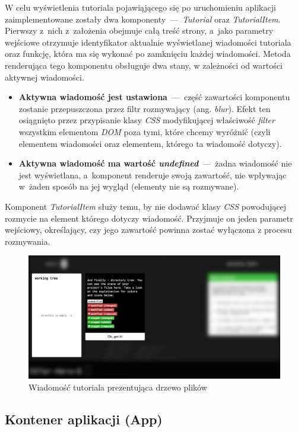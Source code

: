 \documentclass[12pt,a4paper,polish,thesis]{dcsbook}
\begin{document}
{	W celu wyświetlenia tutoriala pojawiąjącego się po uruchomieniu aplikacji zaimplementowane zostały dwa komponenty~---~\textit{Tutorial} oraz \textit{TutorialItem}. Pierwszy z~nich z~założenia obejmuje całą treść strony, a~jako parametry wejściowe otrzymuje identyfikator aktualnie wyświetlanej wiadomości tutoriala oraz funkcję, która ma się wykonać po zamknięciu każdej wiadomości. Metoda renderująca tego komponentu obsługuje dwa stany, w zależności od wartości aktywnej wiadomości. 
	\begin{itemize}
		\item \textbf{Aktywna wiadomość jest ustawiona}~---~część zawartości komponentu zostanie przepuszczona przez filtr rozmywający (ang. \textit{blur}). Efekt ten osiągnięto przez przypisanie klasy \textit{CSS} modyfikującej właściwość  \textit{filter} wszystkim elementom \textit{DOM} poza tymi, które chcemy wyróżnić (czyli elementem wiadomości oraz elementem, którego ta wiadomość dotyczy).
		\item \textbf{Aktywna wiadomość ma wartość \textit{undefined}}~---~żadna wiadomość nie jest wyświetlana, a~komponent renderuje swoją zawartość, nie wpływając w~żaden sposób na jej wygląd (elementy nie są rozmywane).
	\end{itemize}
	Komponent \textit{TutorialItem} służy temu, by nie dodawać klasy \textit{CSS} powodującej rozmycie na element którego dotyczy wiadomość. Przyjmuje on jeden parametr wejściowy, określający, czy jego zawartość powinna zostać wyłączona z procesu rozmywania.

	\begin{figure}[h]
		\centering
		\includegraphics[width=15cm]{component-tutorial}
		\caption{Wiadomość tutoriala prezentująca drzewo plików}
		\label{fig:tutorial}
	\end{figure}
	\FloatBarrier

	\subsection{Kontener aplikacji (App)}

}
\end{document}
